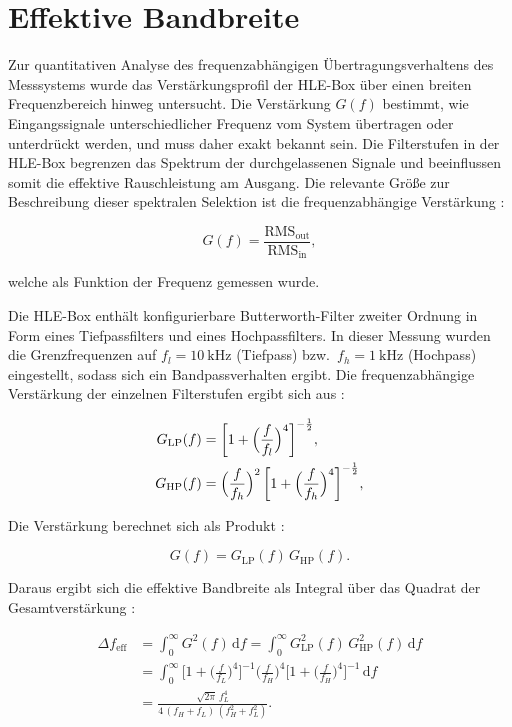 \chapter{Effektive Bandbreite}

Zur quantitativen Analyse des frequenzabhängigen Übertragungsverhaltens des Messsystems wurde das Verstärkungsprofil der HLE-Box über einen breiten Frequenzbereich hinweg untersucht. 
Die Verstärkung $G(f)$ bestimmt, wie Eingangssignale unterschiedlicher Frequenz vom System übertragen oder unterdrückt werden, und muss daher exakt bekannt sein. 
Die Filterstufen in der HLE-Box begrenzen das Spektrum der durchgelassenen Signale und beeinflussen somit die effektive Rauschleistung am Ausgang. 
Die relevante Größe zur Beschreibung dieser spektralen Selektion ist die frequenzabhängige Verstärkung \cite{praktikum}: 

\begin{equation}
  G(f) = \frac{\mathrm{RMS}_{\mathrm{out}}}{\mathrm{RMS}_{\mathrm{in}}},
\end{equation}

welche als Funktion der Frequenz gemessen wurde.

Die HLE-Box enthält konfigurierbare Butterworth-Filter zweiter Ordnung in Form eines Tiefpassfilters und eines Hochpassfilters. 
In dieser Messung wurden die Grenzfrequenzen auf $f_l = \SI{10}{\kilo\hertz}$ (Tiefpass) bzw.\ $f_h = \SI{1}{\kilo\hertz}$ (Hochpass) eingestellt, sodass sich ein Bandpassverhalten ergibt. 
Die frequenzabhängige Verstärkung der einzelnen Filterstufen ergibt sich aus \cite{praktikum}:

\begin{align}
  G_{\mathrm{LP}}(f) &= \biggl[1 + \Bigl(\frac{f}{f_l}\Bigr)^4\biggr]^{-\frac{1}{2}}, \\
  G_{\mathrm{HP}}(f) &= \Bigl(\frac{f}{f_h}\Bigr)^2 \,\biggl[1 + \Bigl(\frac{f}{f_h}\Bigr)^4\biggr]^{-\frac{1}{2}},
\end{align}

Die Verstärkung berechnet sich als Produkt \cite{praktikum}:

\begin{equation}
  G(f) = G_{\mathrm{LP}}(f)\,G_{\mathrm{HP}}(f).
\end{equation}

Daraus ergibt sich die effektive Bandbreite als Integral über das Quadrat der Gesamtverstärkung \cite{praktikum}:

\begin{equation}
\begin{aligned}
\Delta f_{\mathrm{eff}}
  &= \int_{0}^{\infty} G^2(f)\,\mathrm{d}f
   = \int_{0}^{\infty} G_{\mathrm{LP}}^2(f)\,G_{\mathrm{HP}}^2(f)\,\mathrm{d}f \\[6pt]
  &= \int_{0}^{\infty}
    \bigl[1 + \bigl(\tfrac{f}{f_L}\bigr)^4\bigr]^{-1}
    \bigl(\tfrac{f}{f_H}\bigr)^4
    \bigl[1 + \bigl(\tfrac{f}{f_H}\bigr)^4\bigr]^{-1}
    \,\mathrm{d}f \\[6pt]
  &= \frac{\sqrt{2\pi}\,f_L^4}{4\,(f_H + f_L)\,(f_H^2 + f_L^2)}.
\end{aligned}
\end{equation}

